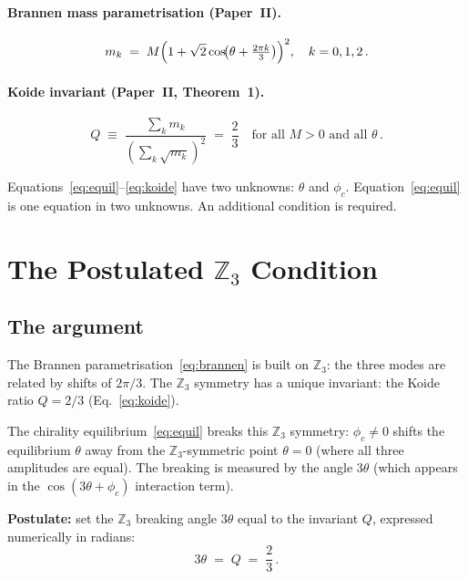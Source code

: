 \documentclass[11pt]{article}
\begin{document}
\paragraph{Brannen mass parametrisation (Paper~II).}
\begin{equation}
  m_k \;=\; M\Bigl(1 + \sqrt{2}\cos\!\bigl(\theta + \tfrac{2\pi k}{3}\bigr)\Bigr)^2,
  \quad k = 0, 1, 2\,.
  \label{eq:brannen}
\end{equation}

\paragraph{Koide invariant (Paper~II, Theorem~1).}
\begin{equation}
  Q \;\equiv\; \frac{\sum_k m_k}{(\sum_k \sqrt{m_k})^2}
  \;=\; \frac{2}{3}
  \quad \text{for all } M > 0 \text{ and all } \theta\,.
  \label{eq:koide}
\end{equation}

Equations~\eqref{eq:equil}--\eqref{eq:koide} have two unknowns: $\theta$ and
$\phi_c$.
Equation~\eqref{eq:equil} is one equation in two unknowns.
An additional condition is required.


\section{The Postulated $\mathbb{Z}_3$ Condition}
\label{sec:self_consistency}

\subsection{The argument}

The Brannen parametrisation~\eqref{eq:brannen} is built on $\mathbb{Z}_3$:
the three modes are related by shifts of $2\pi/3$.
The $\mathbb{Z}_3$ symmetry has a unique invariant: the Koide ratio
$Q = 2/3$ (Eq.~\eqref{eq:koide}).

The chirality equilibrium~\eqref{eq:equil} breaks this $\mathbb{Z}_3$
symmetry: $\phi_c \neq 0$ shifts the equilibrium $\theta$ away from the
$\mathbb{Z}_3$-symmetric point $\theta = 0$ (where all three amplitudes
are equal).
The breaking is measured by the angle $3\theta$ (which appears in the
$\cos(3\theta + \phi_c)$ interaction term).

\textbf{Postulate:} set the $\mathbb{Z}_3$ breaking angle $3\theta$ equal to
the invariant $Q$, expressed numerically in radians:
\begin{equation}
  3\theta \;=\; Q \;=\; \frac{2}{3}\,.
  \label{eq:self_consistency}
\end{equation}
\end{document}
